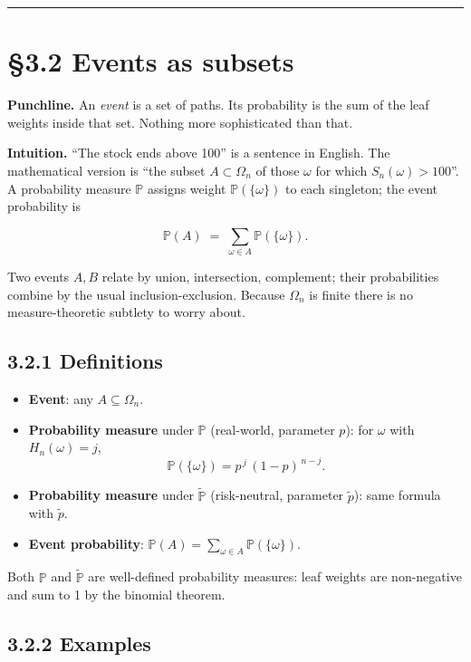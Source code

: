 \documentclass[
  10pt,
  twoside]{book}
\providecommand{\tightlist}{%
  \setlength{\itemsep}{0pt}\setlength{\parskip}{0pt}}
\begin{document}
\begin{center}\rule{0.5\linewidth}{0.5pt}\end{center}

\section{§3.2 Events as subsets}\label{events-as-subsets}

\textbf{Punchline.} An \emph{event} is a set of paths. Its probability
is the sum of the leaf weights inside that set. Nothing more
sophisticated than that.

\textbf{Intuition.} ``The stock ends above 100'' is a sentence in
English. The mathematical version is ``the subset \(A \subset \Omega_n\)
of those \(\omega\) for which \(S_n(\omega) > 100\)''. A probability
measure \(\mathbb P\) assigns weight \(\mathbb P(\{\omega\})\) to each
singleton; the event probability is

\[\mathbb P(A) \;=\; \sum_{\omega \in A} \mathbb P(\{\omega\}).\]

Two events \(A,B\) relate by union, intersection, complement; their
probabilities combine by the usual inclusion-exclusion. Because
\(\Omega_n\) is finite there is no measure-theoretic subtlety to worry
about.

\subsection{3.2.1 Definitions}\label{definitions-7}

\begin{itemize}
\tightlist
\item
  \textbf{Event}: any \(A \subseteq \Omega_n\).
\item
  \textbf{Probability measure} under \(\mathbb P\) (real-world,
  parameter \(p\)): for \(\omega\) with \(H_n(\omega) = j\),
  \[\mathbb P(\{\omega\}) = p^{\,j}\,(1-p)^{\,n-j}.\]
\item
  \textbf{Probability measure} under \(\tilde{\mathbb P}\)
  (risk-neutral, parameter \(\tilde p\)): same formula with
  \(\tilde p\).
\item
  \textbf{Event probability}:
  \(\mathbb P(A) = \sum_{\omega \in A} \mathbb P(\{\omega\})\).
\end{itemize}

Both \(\mathbb P\) and \(\tilde{\mathbb P}\) are well-defined
probability measures: leaf weights are non-negative and sum to 1 by the
binomial theorem.

\subsection{3.2.2 Examples}\label{examples-12}
\end{document}
